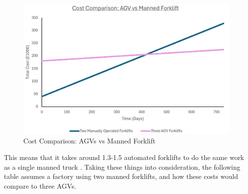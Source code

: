 \documentclass[12pt,titlepage]{article}
\begin{document}
\begin{figure}[ht]
    \centering
    \includegraphics[width=1\linewidth]{CostComparison1.png}
    \caption{Cost Comparison: AGVs vs Manned Forklift}
    \label{fig:timeline}
\end{figure}

This means that it takes around 1.3-1.5 automated forklifts to do the same work as a single manned truck \cite{Pastor-Tella2024}. Taking these things into consideration, the following table assumes a factory using two manned forklifts, and how these costs would compare to three AGVs.

\FloatBarrier
\end{document}
